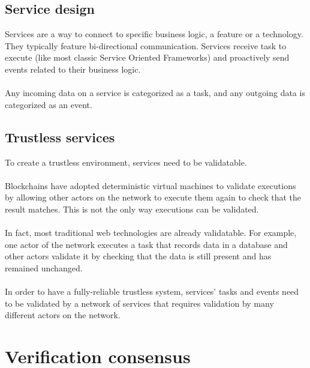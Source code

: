 \documentclass[12pt,a4paper,final]{article}
\begin{document}
\subsection{Service design}

Services are a way to connect to specific business logic, a feature or a technology. They typically feature bi-directional communication. Services receive task to execute (like most classic Service Oriented Frameworks) and proactively send events related to their business logic.
\\\\
Any incoming data on a service is categorized as a task, and any outgoing data is categorized as an event.

\subsection{Trustless services}

To create a trustless environment, services need to be validatable. 
\\\\
Blockchains have adopted deterministic virtual machines to validate executions by allowing other actors on the network to execute them again to check that the result matches. This is not the only way executions can be validated.
\\\\
In fact, most traditional web technologies are already validatable. For example, one actor of the network executes a task that records data in a database and other actors validate it by checking that the data is still present and has remained unchanged.
\\\\
In order to have a fully-reliable trustless system, services’ tasks and events need to be validated  by a network of services that requires validation by many different actors on the network.

\section{Verification consensus}
\end{document}
